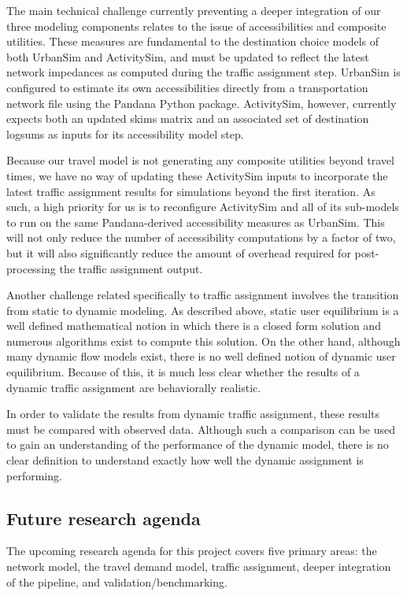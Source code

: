 The main technical challenge currently preventing a deeper integration of our three modeling components relates to the issue of accessibilities and composite utilities. These measures are fundamental to the destination choice models of both UrbanSim and ActivitySim, and must be updated to reflect the latest network impedances as computed during the traffic assignment step. UrbanSim is configured to estimate its own accessibilities directly from a transportation network file using the Pandana Python package. ActivitySim, however, currently expects both an updated skims matrix and an associated set of destination logsums as inputs for its accessibility model step.

Because our travel model is not generating any composite utilities beyond travel times, we have no way of updating these ActivitySim inputs to incorporate the latest traffic assignment results for simulations beyond the first iteration. As such, a high priority for us is to reconfigure ActivitySim and all of its sub-models to run on the same Pandana-derived accessibility measures as UrbanSim. This will not only reduce the number of accessibility computations by a factor of two, but it will also significantly reduce the amount of overhead required for post-processing the traffic assignment output.

Another challenge related specifically to traffic assignment involves the transition from static to dynamic modeling. As described above, static user equilibrium is a well defined mathematical notion in which there is a closed form solution and numerous algorithms exist to compute this solution. On the other hand, although many dynamic flow models exist, there is no well defined notion of dynamic user equilibrium. Because of this, it is much less clear whether the results of a dynamic traffic assignment are behaviorally realistic.

In order to validate the results from dynamic traffic assignment, these results must be compared with observed data. Although such a comparison can be used to gain an understanding of the performance of the dynamic model, there is no clear definition to understand exactly how well the dynamic assignment is performing. 



\subsection{Future research agenda}

The upcoming research agenda for this project covers five primary areas: the network model, the travel demand model, traffic assignment, deeper integration of the pipeline, and validation/benchmarking.

